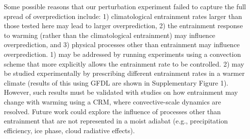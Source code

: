 \documentclass[draft]{agujournal2019}
\begin{document}
Some possible reasons that our perturbation experiment failed to capture the full spread of overprediction include: 1) climatological entrainment rates larger than those tested here may lead to larger overprediction, 2) the entrainment response to warming (rather than the climatological entrainment) may influence overprediction, and 3) physical processes other than entrainment may influence overprediction. 1) may be addressed by running experiments using a convection scheme that more explicitly allows the entrainment rate to be controlled. 2) may be studied experimentally by prescribing different entrainment rates in a warmer climate (results of this using GFDL are shown in Supplementary Figure 1). However, such results must be validated with studies on how entrainment may change with warming using a CRM, where convective-scale dynamics are resolved. Future work could explore the influence of processes other than entrainment that are not represented in a moist adiabat (e.g., precipitation efficiency, ice phase, cloud radiative effects).







%
%
%
%
%
%
%
%
%
%
\end{document}
